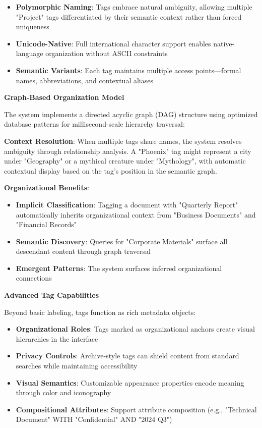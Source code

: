 \documentclass[sigconf]{acmart}
\begin{document}
\begin{itemize}[noitemsep, topsep=0pt]
 \item \textbf{Polymorphic Naming}: Tags embrace natural ambiguity, allowing multiple "Project" tags differentiated by their semantic context rather than forced uniqueness
 \item \textbf{Unicode-Native}: Full international character support enables native-language organization without ASCII constraints
 \item \textbf{Semantic Variants}: Each tag maintains multiple access points---formal names, abbreviations, and contextual aliases
\end{itemize}

\textbf{Graph-Based Organization Model}

The system implements a directed acyclic graph (DAG) structure using optimized database patterns for millisecond-scale hierarchy traversal:

\textbf{Context Resolution}: When multiple tags share names, the system resolves ambiguity through relationship analysis. A "Phoenix" tag might represent a city under "Geography" or a mythical creature under "Mythology", with automatic contextual display based on the tag's position in the semantic graph.

\textbf{Organizational Benefits}:
\begin{itemize}[noitemsep, topsep=0pt]
 \item \textbf{Implicit Classification}: Tagging a document with "Quarterly Report" automatically inherits organizational context from "Business Documents" and "Financial Records"
 \item \textbf{Semantic Discovery}: Queries for "Corporate Materials" surface all descendant content through graph traversal
 \item \textbf{Emergent Patterns}: The system surfaces inferred organizational connections
\end{itemize}

\textbf{Advanced Tag Capabilities}

Beyond basic labeling, tags function as rich metadata objects:

\begin{itemize}[noitemsep, topsep=0pt]
 \item \textbf{Organizational Roles}: Tags marked as organizational anchors create visual hierarchies in the interface
 \item \textbf{Privacy Controls}: Archive-style tags can shield content from standard searches while maintaining accessibility
 \item \textbf{Visual Semantics}: Customizable appearance properties encode meaning through color and iconography
 \item \textbf{Compositional Attributes}: Support attribute composition (e.g., "Technical Document" WITH "Confidential" AND "2024 Q3")
\end{itemize}
\end{document}

